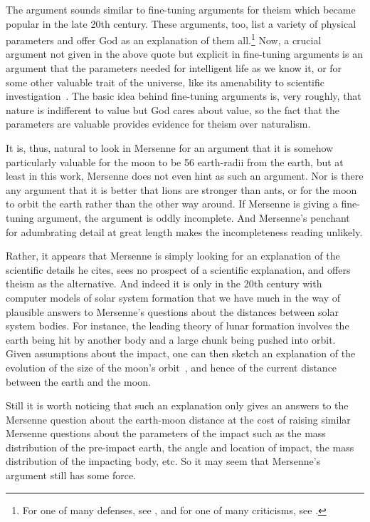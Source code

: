 The argument sounds similar to fine-tuning arguments for theism which became popular in the late 20th century. These
arguments, too, list a variety of physical parameters and offer God as an explanation of them 
all.\footnote{For one of many defenses, see , and for one of 
many criticisms, see .}
Now, a crucial
argument not given in the above quote but explicit in fine-tuning arguments is an argument that the 
parameters needed for intelligent life
as we know it, or for some other valuable trait of the universe, like its amenability to scientific investigation~\parencite{CollinsDiscoverability}.
The basic idea behind fine-tuning arguments is, very roughly, that nature is indifferent to value but God cares 
about value, so the fact that the parameters are valuable provides evidence for theism over naturalism.

It is, thus, natural to look in Mersenne for an argument that it is somehow particularly valuable for the moon to be 56 earth-radii
from the earth, but at least in this work, Mersenne does not even hint as such an argument. Nor is there any argument
that it is better that lions are stronger than ants, or for the moon to orbit the earth rather than
the other way around. If Mersenne is giving a fine-tuning argument, the argument is oddly incomplete. And Mersenne's
penchant for adumbrating detail at great length makes the incompleteness reading unlikely.

Rather, it appears that Mersenne is simply looking for an explanation of the scientific details he cites, sees no
prospect of a scientific explanation, and offers theism as the alternative. And indeed it is only in the 20th century
with computer models of solar system formation that we have much in the way of plausible answers to Mersenne's questions
about the distances between solar system bodies. For instance, the leading theory of lunar formation involves the earth being hit by
another body and a large chunk being pushed into orbit. Given assumptions about the impact, one can then sketch an 
explanation of  the evolution of the size of the moon's orbit~\parencite{Canup2014}, and hence of the current distance between the earth and the moon. 

Still it is worth noticing that such an explanation only gives an answers to the 
Mersenne question about the earth-moon distance at the cost of raising similar Mersenne questions about the 
parameters of the impact such as the mass distribution of the pre-impact earth, the angle and location of impact, the 
mass distribution of the impacting body, etc. So it may seem that Mersenne's argument still has some force.

